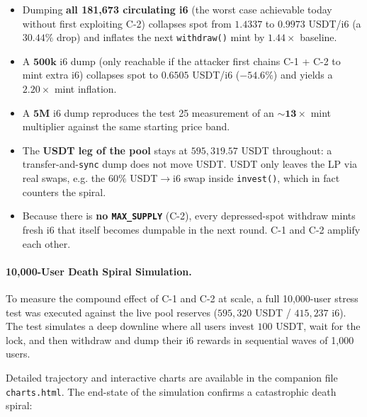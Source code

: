 \documentclass[11pt,a4paper]{article}
\begin{document}
\begin{itemize}[leftmargin=*]
    \item Dumping \textbf{all 181{,}673 circulating i6} (the worst case
          achievable today without first exploiting C-2) collapses spot
          from $1.4337$ to $0.9973$ USDT/i6 (a $30.44\%$ drop) and
          inflates the next \texttt{withdraw()} mint by $\mathbf{1.44\times}$
          baseline.
    \item A $\mathbf{500\text{k}}$ i6 dump (only reachable if the attacker
          first chains C-1 + C-2 to mint extra i6) collapses spot to
          $0.6505$ USDT/i6 ($-54.6\%$) and yields a
          $\mathbf{2.20\times}$ mint inflation.
    \item A $\mathbf{5\text{M}}$ i6 dump reproduces the test 25
          measurement of an $\mathbf{\sim 13\times}$ mint multiplier
          against the same starting price band.
    \item The \textbf{USDT leg of the pool} stays at $595{,}319.57$ USDT
          throughout: a transfer-and-\texttt{sync} dump does not move USDT.
          USDT only leaves the LP via real swaps, e.g. the $60\%$
          USDT$\rightarrow$i6 swap inside \texttt{invest()}, which in fact
          counters the spiral.
    \item Because there is \textbf{no \texttt{MAX\_SUPPLY}} (C-2), every
          depressed-spot withdraw mints fresh i6 that itself becomes
          dumpable in the next round. C-1 and C-2 amplify each other.
\end{itemize}

\paragraph{10,000-User Death Spiral Simulation.}

To measure the compound effect of C-1 and C-2 at scale, a full 10,000-user 
stress test was executed against the live pool reserves ($595{,}320$ USDT / $415{,}237$ i6). 
The test simulates a deep downline where all users invest $100$ USDT, wait for the lock, 
and then withdraw and dump their i6 rewards in sequential waves of 1,000 users. 

Detailed trajectory and interactive charts are available in the companion file \texttt{charts.html}. The end-state of the simulation confirms a catastrophic death spiral:
\end{document}
